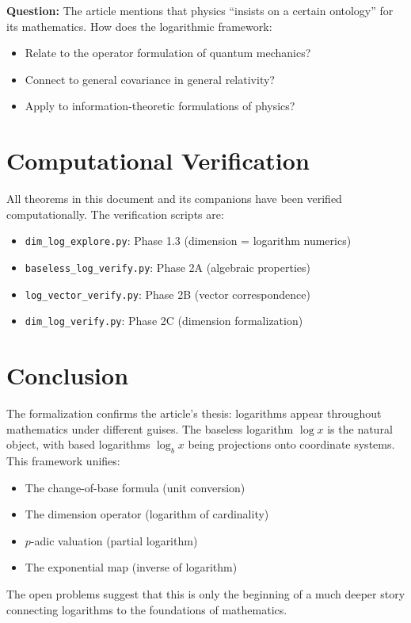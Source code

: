 \documentclass[11pt]{article}
\begin{document}
\textbf{Question:} The article mentions that physics ``insists on a certain ontology'' for its mathematics. How does the logarithmic framework:
\begin{itemize}
\item Relate to the operator formulation of quantum mechanics?
\item Connect to general covariance in general relativity?
\item Apply to information-theoretic formulations of physics?
\end{itemize}

\section{Computational Verification}
\label{sec:computational}

All theorems in this document and its companions have been verified computationally. The verification scripts are:
\begin{itemize}
\item \texttt{dim\_log\_explore.py}: Phase 1.3 (dimension = logarithm numerics)
\item \texttt{baseless\_log\_verify.py}: Phase 2A (algebraic properties)
\item \texttt{log\_vector\_verify.py}: Phase 2B (vector correspondence)
\item \texttt{dim\_log\_verify.py}: Phase 2C (dimension formalization)
\end{itemize}

\section{Conclusion}
\label{sec:conclusion}

The formalization confirms the article's thesis: logarithms appear throughout mathematics under different guises. The baseless logarithm $\log x$ is the natural object, with based logarithms $\log_b x$ being projections onto coordinate systems. This framework unifies:
\begin{itemize}
\item The change-of-base formula (unit conversion)
\item The dimension operator (logarithm of cardinality)
\item $p$-adic valuation (partial logarithm)
\item The exponential map (inverse of logarithm)
\end{itemize}

The open problems suggest that this is only the beginning of a much deeper story connecting logarithms to the foundations of mathematics.
\end{document}
